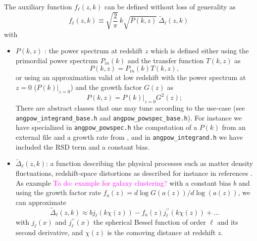 \documentclass[\docopts]{\docclass}
\newcommand{\todo}[1]{\textcolor{magenta}{To do: #1}}
\begin{document}
The auxiliary function $f_\ell(z,k)$ can be defined without loss of generality as
\begin{equation}
f_\ell(z,k) \equiv  \sqrt{\frac{2}{\pi}}\  k \sqrt{P(k,z)}\ \widetilde{\Delta}_\ell(z,k)\label{eq-fell-func}
\end{equation}
with
\begin{itemize}
\item  $P(k,z)$ : the power spectrum at redshift $z$ which is defined either using the primordial power spectrum $P_{in}(k)$ and the transfer function $T(k,z)$ as
\begin{equation}
P(k,z) = P_{in}(k) T(k,z),
\end{equation}
or using an approximation valid at low redshift  with the power spectrum at $z=0$ ($P(k)|_{z=0}$) and the growth factor $G(z)$ as
\begin{equation}
P(k,z) = P(k)|_{z=0} G^2(z);
\end{equation}
There are abstract classes that one may tune according to the use-case (see \texttt{angpow\_integrand\_base.h} and \texttt{angpow\_powspec\_base.h}). For instance we have specialized in \texttt{angpow\_powspec.h} the computation of a $P(k)$ from an external
file and a growth rate from \citet{1991MNRAS.251..128L, 1992ARA&A..30..499C}, and in \texttt{angpow\_integrand.h} we have included the RSD term and a constant bias.
\item $\widetilde{\Delta}_\ell(z,k)$: a function describing the physical processes such as matter density fluctuations, redshift-space distortions as described for instance in references \citet{2008cmb..book.....D,2009PhRvD..80h3514Y,2010PhRvD..82h3508Y, 2011PhRvD..84d3516C,2011PhRvD..84f3505B}. As example \todo{example for galaxy clustering?} with a constant bias $b$ and using the growth factor rate $f_a(z) = d\log G(a(z))/d\log(a(z))$, we can approximate
\begin{equation}
 \widetilde{\Delta}_\ell(z,k) \approx b j_\ell(k \chi(z)) - f_a(z) j_\ell^{\prime\prime}(k \chi(z)) + \dots
\end{equation}
with $j_\ell(x)$ and $j_\ell^{\prime\prime}(x)$ the spherical Bessel function of order $\ell$ and its second derivative, and $\chi(z)$ is the comoving distance at redshift $z$.
\end{itemize}
\end{document}
